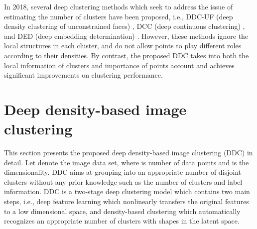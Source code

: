 \documentclass[10pt,twocolumn,letterpaper]{article}
\begin{document}
In 2018, several deep clustering methods  \cite{lin2018deep,Shah2018DCC,Wang2018DED} which seek to address the issue of estimating the number of clusters have been proposed, i.e., DDC-UF (deep density clustering of unconstrained faces) \cite{lin2018deep}, DCC (deep continuous clustering) \cite{Shah2018DCC}, and DED (deep embedding determination) \cite{Wang2018DED}. 
However, these methods ignore the local structures in each cluster, and do not allow points to play different roles according to their densities. By contrast, the proposed DDC takes into both the local information of clusters and importance of points account and achieves significant improvements on clustering performance.

\iffalse
\textbf{
DCC
DDC-UF 
As a result, the performance of deep clustering methods without knowing the number of clusters should be further improved. To this end, we present a novel deep density-based clustering model for image clustering as below.
Some methods have been proposed to estimate the number of clusters in deep clustering models \cite{lin2018deep,Shah2018DCC,Wang2018DED}. However, these works either lack of cluster interpretation, or directly apply existing density-based clustering techniques which do not consider the local structure of clusters and the importance of data points.
}
\fi 

\section{Deep density-based image clustering}\label{sec:method}
This section presents the proposed deep density-based image clustering (DDC) in detail. Let  denote the image data set, where  is number of data points and  is the dimensionality.
DDC aims at grouping  into an appropriate number of disjoint clusters without any prior knowledge such as the number of clusters and label information.
DDC is a two-stage deep clustering model which contains two main steps, i.e., deep feature learning which nonlinearly transfers the original features to a low dimensional space, and density-based clustering which automatically recognizes an appropriate number of clusters with shapes in the latent space.
\end{document}
